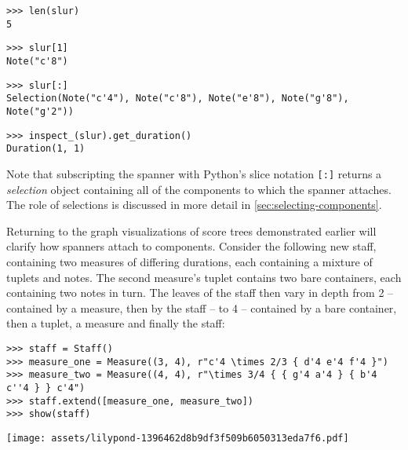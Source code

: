 \begin{abjadbookoutput}
\begin{singlespacing}
\vspace{-0.5\baselineskip}
\begin{verbatim}
>>> len(slur)
5
\end{verbatim}
\begin{verbatim}
>>> slur[1]
Note("c'8")
\end{verbatim}
\begin{verbatim}
>>> slur[:]
Selection(Note("c'4"), Note("c'8"), Note("e'8"), Note("g'8"), Note("g'2"))
\end{verbatim}
\begin{verbatim}
>>> inspect_(slur).get_duration()
Duration(1, 1)
\end{verbatim}
\end{singlespacing}
\end{abjadbookoutput}

\noindent Note that subscripting the spanner with Python's slice notation
\texttt{[:]} returns a \emph{selection} object containing all of the components
to which the spanner attaches. The role of selections is discussed in more
detail in \autoref{sec:selecting-components}.

Returning to the graph visualizations of score trees demonstrated
earlier will clarify how spanners attach to components. Consider the following
new staff, containing two measures of differing durations, each containing a
mixture of tuplets and notes. The second measure's tuplet contains two bare
containers, each containing two notes in turn. The leaves of the staff then
vary in depth from 2 -- contained by a measure, then by the staff -- to 4 --
contained by a bare container, then a tuplet, a measure and finally the staff:

\begin{comment}
<abjad>
staff = Staff()
measure_one = Measure((3, 4), r"c'4 \times 2/3 { d'4 e'4 f'4 }")
measure_two = Measure((4, 4), r"\times 3/4 { { g'4 a'4 } { b'4 c''4 } } c'4")
staff.extend([measure_one, measure_two])
show(staff)
</abjad>
\end{comment}

\begin{abjadbookoutput}
\begin{singlespacing}
\vspace{-0.5\baselineskip}
\begin{verbatim}
>>> staff = Staff()
>>> measure_one = Measure((3, 4), r"c'4 \times 2/3 { d'4 e'4 f'4 }")
>>> measure_two = Measure((4, 4), r"\times 3/4 { { g'4 a'4 } { b'4 c''4 } } c'4")
>>> staff.extend([measure_one, measure_two])
>>> show(staff)
\end{verbatim}
\noindent\texttt{[image: assets/lilypond-1396462d8b9df3f509b6050313eda7f6.pdf]}
\end{singlespacing}
\end{abjadbookoutput}

